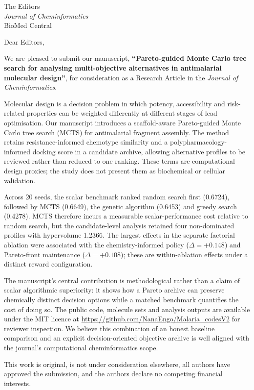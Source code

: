 \documentclass[11pt,a4paper]{letter}
\begin{document}
\begin{letter}{%
  The Editors \\
  \textit{Journal of Cheminformatics} \\
  BioMed Central
}

\opening{Dear Editors,}

We are pleased to submit our manuscript, \textbf{``Pareto-guided Monte Carlo tree search for analysing multi-objective alternatives in antimalarial molecular design''}, for consideration as a Research Article in the \textit{Journal of Cheminformatics}.

Molecular design is a decision problem in which potency, accessibility and risk-related properties can be weighted differently at different stages of lead optimisation. Our manuscript introduces a scaffold-aware Pareto-guided Monte Carlo tree search (MCTS) for antimalarial fragment assembly. The method retains resistance-informed chemotype similarity and a polypharmacology-informed docking score in a candidate archive, allowing alternative profiles to be reviewed rather than reduced to one ranking. These terms are computational design proxies; the study does not present them as biochemical or cellular validation.

Across \num{20} seeds, the scalar benchmark ranked random search first (\num{0.6724}), followed by MCTS (\num{0.6649}), the genetic algorithm (\num{0.6453}) and greedy search (\num{0.4278}). MCTS therefore incurs a measurable scalar-performance cost relative to random search, but the candidate-level analysis retained four non-dominated profiles with hypervolume \num{1.2366}. The largest effects in the separate factorial ablation were associated with the chemistry-informed policy ($\Delta=+\num{0.148}$) and Pareto-front maintenance ($\Delta=+\num{0.108}$); these are within-ablation effects under a distinct reward configuration.

The manuscript's central contribution is methodological rather than a claim of scalar algorithmic superiority: it shows how a Pareto archive can preserve chemically distinct decision options while a matched benchmark quantifies the cost of doing so. The public code, molecule sets and analysis outputs are available under the MIT licence at \url{https://github.com/NanaEngo/Malaria_codesV2} for reviewer inspection. We believe this combination of an honest baseline comparison and an explicit decision-oriented objective archive is well aligned with the journal's computational cheminformatics scope.

This work is original, is not under consideration elsewhere, all authors have approved the submission, and the authors declare no competing financial interests.


\end{letter}
\end{document}

